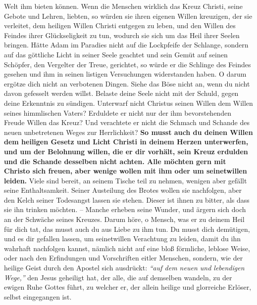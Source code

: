 Welt ihm bieten können. Wenn die Menschen wirklich das Kreuz
Christi, seine
Gebote und Lehren, liebten, so würden sie ihren eigenen Willen
kreuzigen, der
sie verleitet, dem heiligen Willen Christi entgegen zu leben, und den Willen des
Feindes ihrer Glückseligkeit zu tun, wodurch sie sich um
das Heil ihrer Seelen
bringen. Hätte Adam im Paradies
nicht auf die Lockpfeife der Schlange, sondern
auf das göttliche Licht in seiner Seele geachtet und sein Gemüt auf seinen
Schöpfer, den Vergelter der Treue, gerichtet, so würde er die Schlinge des
Feindes gesehen und ihm in seinen listigen Versuchungen widerstanden haben. O
darum ergötze dich nicht an verbotenen Dingen. Siehe das Böse nicht
an, wenn du
nicht davon gefesselt werden willst. Belaste deine Seele nicht mit der Schuld,
gegen deine Erkenntnis zu sündigen. Unterwarf nicht Christus seinen Willen dem
Willen seines himmlischen Vaters? Erduldete er nicht nur der ihm bevorstehenden
Freude Willen das Kreuz? Und verachtete er nicht die
Schmach und Schande des
neuen unbetretenen Weges zur Herrlichkeit?
\label{ref:12_11_opfer} \textbf{So musst auch du
deinen Willen dem heiligen Gesetz und Licht
Christi in deinem Herzen
unterwerfen, und um der Belohnung willen, die er dir vorhält,
sein Kreuz erdulden und die Schande desselben nicht achten. Alle möchten gern
mit Christo
sich freuen, aber wenige wollen mit ihm oder um seinetwillen
leiden.} Viele sind
bereit, an seinem Tische teil zu nehmen, wenigen aber gefällt seine
Enthaltsamkeit. Seiner Austeilung des Brotes wollen sie
nachfolgen, aber den
Kelch seiner Todesangst lassen sie stehen. Dieser ist
ihnen zu bitter, als dass
sie ihn trinken möchten. -- Manche erheben seine Wunder, und
ärgern sich doch an
der Schwäche seines Kreuzes. Darum höre, o Mensch, was
er zu deinem Heil für
dich tat, das musst auch du aus Liebe zu ihm tun. Du musst dich demütigen, und
es dir gefallen lassen, um seinetwillen Verachtung zu leiden, damit du ihn
wahrhaft nachfolgen kannst, nämlich nicht auf eine bloß
förmliche, leblose Weise, oder nach den Erfindungen und
Vorschriften eitler Menschen, sondern, wie
der heilige Geist durch den Apostel sich ausdrückt:
\textit{"`auf dem neuen und
lebendigen Wege,"'}
den Jesus geheiligt hat, der alle, die
auf demselben wandeln, zu der ewigen Ruhe Gottes führt, zu
welcher er, der
allein heilige und glorreiche Erlöser, selbst eingegangen ist.





